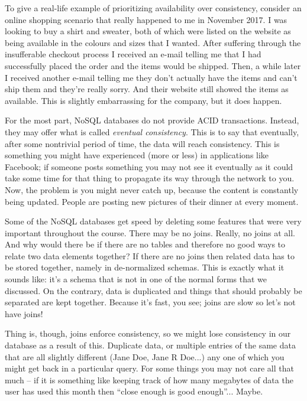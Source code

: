 To give a real-life example of prioritizing availability over consistency, consider an online shopping scenario that really happened to me in November 2017. I was looking to buy a shirt and sweater, both of which were listed on the website as being available in the colours and sizes that I wanted. After suffering through the insufferable checkout process I received an e-mail telling me that I had successfully placed the order and the items would be shipped. Then, a while later I received another e-mail telling me they don't actually have the items and can't ship them and they're really sorry. And their website still showed the items as available. This is slightly embarrassing for the company, but it does happen.

For the most part, NoSQL databases do not provide ACID transactions. Instead, they may offer what is called \textit{eventual consistency}. This is to say that eventually, after some nontrivial period of time, the data will reach consistency. This is something you might have experienced (more or less) in applications like Facebook; if someone posts something you may not see it eventually as it could take some time for that thing to propagate its way through the network to you. Now, the problem is you might never catch up, because the content is constantly being updated. People are posting new pictures of their dinner at every moment.

Some of the NoSQL databases get speed by deleting some features that were very important throughout the course. There may be no joins. Really, no joins at all. And why would there be if there are no tables and therefore no good ways to relate two data elements together? If there are no joins then related data has to be stored together, namely in de-normalized schemas. This is exactly what it sounds like: it's a schema that is not in one of the normal forms that we discussed. On the contrary, data is duplicated and things that should probably be separated are kept together. Because it's fast, you see; joins are slow so let's not have joins!

Thing is, though, joins enforce consistency, so we might lose consistency in our database as a result of this. Duplicate data, or multiple entries of the same data that are all slightly different (Jane Doe, Jane R Doe...) any one of which you might get back in a particular query. For some things you may not care all that much -- if it is something like keeping track of how many megabytes of data the user has used this month then ``close enough is good enough''... Maybe.

